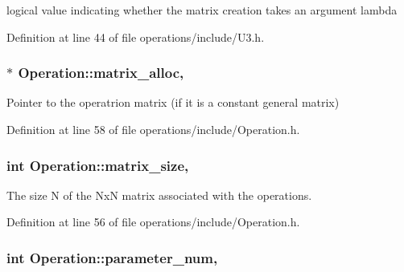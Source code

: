 logical value indicating whether the matrix creation takes an argument lambda 



Definition at line 44 of file operations/include/\+U3.\+h.

\subsubsection[{\texorpdfstring{matrix\+\_\+alloc}{matrix_alloc}}]{ $\ast$ Operation\+::matrix\+\_\+alloc\hspace{0.3cm}{\ttfamily [protected]}, {\ttfamily [inherited]}}\hypertarget{class_operation_ade4d28d271ca13950d04363aac1c382e}{}\label{class_operation_ade4d28d271ca13950d04363aac1c382e}


Pointer to the operatrion matrix (if it is a constant general matrix) 



Definition at line 58 of file operations/include/\+Operation.\+h.

\subsubsection[{\texorpdfstring{matrix\+\_\+size}{matrix_size}}]{\setlength{\rightskip}{0pt plus 5cm}int Operation\+::matrix\+\_\+size\hspace{0.3cm}{\ttfamily [protected]}, {\ttfamily [inherited]}}\hypertarget{class_operation_a8236c07112cb165a00d3869363808624}{}\label{class_operation_a8236c07112cb165a00d3869363808624}


The size N of the NxN matrix associated with the operations. 



Definition at line 56 of file operations/include/\+Operation.\+h.

\subsubsection[{\texorpdfstring{parameter\+\_\+num}{parameter_num}}]{\setlength{\rightskip}{0pt plus 5cm}int Operation\+::parameter\+\_\+num\hspace{0.3cm}{\ttfamily [protected]}, {\ttfamily [inherited]}}\hypertarget{class_operation_aa57505afe5b5ec27f6d053044b86e043}{}\label{class_operation_aa57505afe5b5ec27f6d053044b86e043}


